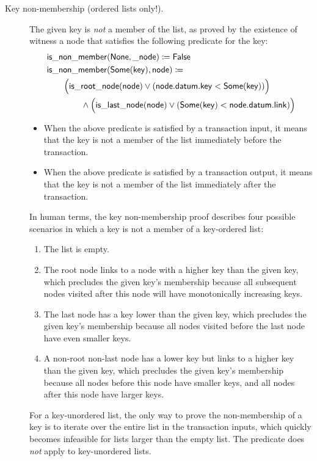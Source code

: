 \documentclass[../midgard.tex]{subfiles}
\begin{document}
\begin{description}
    \item[Key non-membership (ordered lists only!).] The given key is \emph{not} a member of the list, as proved by the existence of witness a node that satisfies the following predicate for the key:
        \begin{align*}
            &\mathsf{is\_non\_member} (\mathsf{None}, \mathsf{\_node}) \coloneq \mathsf{False} \\
            &\mathsf{is\_non\_member} (\mathsf{Some}(\mathsf{key}), \mathsf{node}) \coloneq \\
            &\qquad
                \Bigl( \mathsf{is\_root\_node} (\mathsf{node}) 
                    \lor (\mathsf{node.datum.key} < \mathsf{Some}(\mathsf{key})) \Bigr) \\
            &\qquad\qquad\land
                \Bigl( \mathsf{is\_last\_node} (\mathsf{node}) 
                    \lor (\mathsf{Some}(\mathsf{key}) < \mathsf{node.datum.link}) \Bigr)
        \end{align*}
        \begin{itemize}
            \item When the above predicate is satisfied by a transaction input, it means that the key is not a member of the list immediately before the transaction.
            \item When the above predicate is satisfied by a transaction output, it means that the key is not a member of the list immediately after the transaction. 
        \end{itemize}
    In human terms, the key non-membership proof describes four possible scenarios in which a key is not a member of a key-ordered list:
    \begin{enumerate}
        \item The list is empty.
        \item The root node links to a node with a higher key than the given key, which precludes the given key's membership because all subsequent nodes visited after this node will have monotonically increasing keys.
        \item The last node has a key lower than the given key, which precludes the given key's membership because all nodes visited before the last node have even smaller keys.
        \item A non-root non-last node has a lower key but links to a higher key than the given key, which precludes the given key's membership because all nodes before this node have smaller keys, and all nodes after this node have larger keys.
    \end{enumerate}
    For a key-unordered list, the only way to prove the non-membership of a key is to iterate over the entire list in the transaction inputs, which quickly becomes infeasible for lists larger than the empty list. The  predicate does \emph{not} apply to key-unordered lists.
\end{description}
\end{document}

